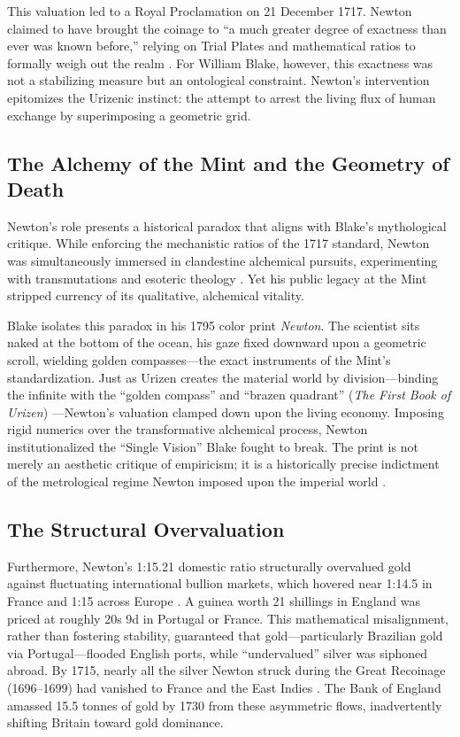 \documentclass[
]{article}
\begin{document}
This valuation led to a Royal Proclamation on 21 December 1717. Newton
claimed to have brought the coinage to ``a much greater degree of
exactness than ever was known before,'' relying on Trial Plates and
mathematical ratios to formally weigh out the realm
\citep{horsefield1960british}. For William Blake, however, this
exactness was not a stabilizing measure but an ontological constraint.
Newton's intervention epitomizes the Urizenic instinct: the attempt to
arrest the living flux of human exchange by superimposing a geometric
grid.

\subsection{The Alchemy of the Mint and the Geometry of
Death}\label{the-alchemy-of-the-mint-and-the-geometry-of-death}

Newton's role presents a historical paradox that aligns with Blake's
mythological critique. While enforcing the mechanistic ratios of the
1717 standard, Newton was simultaneously immersed in clandestine
alchemical pursuits, experimenting with transmutations and esoteric
theology \citep{schouten2020epicurean}. Yet his public legacy at the
Mint stripped currency of its qualitative, alchemical vitality.

Blake isolates this paradox in his 1795 color print \emph{Newton}. The
scientist sits naked at the bottom of the ocean, his gaze fixed downward
upon a geometric scroll, wielding golden compasses---the exact
instruments of the Mint's standardization. Just as Urizen creates the
material world by division---binding the infinite with the ``golden
compass'' and ``brazen quadrant'' (\emph{The First Book of Urizen})
\citep{blake1795urizen}---Newton's valuation clamped down upon the
living economy. Imposing rigid numerics over the transformative
alchemical process, Newton institutionalized the ``Single Vision'' Blake
fought to break. The print is not merely an aesthetic critique of
empiricism; it is a historically precise indictment of the metrological
regime Newton imposed upon the imperial world
\citep{albernaz2024common, makdisi2003william}.

\subsection{The Structural
Overvaluation}\label{the-structural-overvaluation}

Furthermore, Newton's 1:15.21 domestic ratio structurally overvalued
gold against fluctuating international bullion markets, which hovered
near 1:14.5 in France and 1:15 across Europe \citep{quinn2006bank}. A
guinea worth 21 shillings in England was priced at roughly 20s 9d in
Portugal or France. This mathematical misalignment, rather than
fostering stability, guaranteed that gold---particularly Brazilian gold
via Portugal---flooded English ports, while ``undervalued'' silver was
siphoned abroad. By 1715, nearly all the silver Newton struck during the
Great Recoinage (1696--1699) had vanished to France and the East Indies
\citep{quinn1996competing}. The Bank of England amassed 15.5 tonnes of
gold by 1730 from these asymmetric flows, inadvertently shifting Britain
toward gold dominance.
\end{document}
